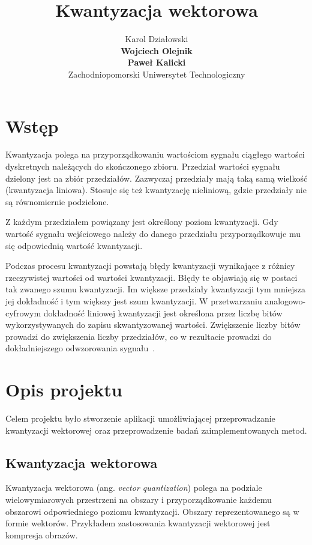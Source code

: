 \documentclass{article}
\title{Kwantyzacja wektorowa}
\author{
  Karol Działowski \\
  \textbf{Wojciech Olejnik} \\
  \textbf{Paweł Kalicki} \\
  Zachodniopomorski Uniwersytet Technologiczny
}
\begin{document}
\maketitle
\begin{abstract}
\lipsum[1-2]
\end{abstract}

\newpage

\tableofcontents

\newpage



\section{Wstęp}

Kwantyzacja polega na przyporządkowaniu wartościom sygnału ciągłego wartości dyskretnych należących do skończonego zbioru.
Przedział wartości sygnału dzielony jest na zbiór przedziałów.
Zazwyczaj przedziały mają taką samą wielkość (kwantyzacja liniowa).
Stosuje się też kwantyzację nieliniową, gdzie przedziały nie są równomiernie podzielone. 

Z każdym przedziałem powiązany jest określony poziom kwantyzacji. 
Gdy wartość sygnału wejściowego należy do danego przedziału przyporządkowuje mu się odpowiednią wartość kwantyzacji.

Podczas procesu kwantyzacji powstają błędy kwantyzacji wynikające z różnicy rzeczywistej wartości od wartości kwantyzacji. 
Błędy te objawiają się w postaci tak zwanego szumu kwantyzacji. 
Im większe przedziały kwantyzacji tym mniejsza jej dokładność i tym większy jest szum kwantyzacji. 
W przetwarzaniu analogowo-cyfrowym dokładność liniowej kwantyzacji jest określona przez liczbę bitów wykorzystywanych do zapisu skwantyzowanej wartości. 
Zwiększenie liczby bitów prowadzi do zwiększenia liczby przedziałów, co w rezultacie prowadzi do dokładniejszego odwzorowania \mbox{sygnału \cite{drozdek2007wprowadzenie}.}

\section{Opis projektu}

Celem projektu było stworzenie aplikacji umożliwiającej przeprowadzanie kwantyzacji wektorowej oraz przeprowadzenie badań
zaimplementowanych metod.

\subsection{Kwantyzacja wektorowa}
Kwantyzacja wektorowa (ang. \emph{vector quantization}) polega na podziale wielowymiarowych przestrzeni na obszary i
przyporządkowanie każdemu obszarowi odpowiedniego poziomu kwantyzacji.
Obszary reprezentowanego są w formie wektorów.
Przykładem zastosowania kwantyzacji wektorowej jest kompresja obrazów.
\end{document}
